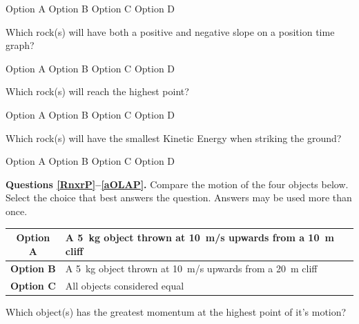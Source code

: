 \documentclass[]{exam}
\begin{document}
\begin{questions}
\begin{randomizechoices}[norandomize]
    \choice Option A
    \choice Option B
    \choice Option C
    \correctchoice Option D
\end{randomizechoices}


\question
Which rock(s) will have both a positive and negative slope on a position time graph?

\begin{randomizechoices}[norandomize]
    \correctchoice Option A
    \choice Option B
    \choice Option C
    \choice Option D
\end{randomizechoices}

\question
Which rock(s) will reach the highest point?

\begin{randomizechoices}[norandomize]
    \correctchoice Option A
    \choice Option B
    \choice Option C
    \choice Option D
\end{randomizechoices}


\question \label{louIV}
Which rock(s) will have the smallest Kinetic Energy when striking the ground?

\begin{randomizechoices}[norandomize]
    \choice Option A
    \choice Option B
    \correctchoice Option C
    \choice Option D
\end{randomizechoices}

\begin{EnvUplevel}
    \textbf{Questions \ref{RnxrP}--\ref{aOLAP}.} Compare the motion of the four objects below. Select the choice that best answers the question. Answers may be used more than once. 
\end{EnvUplevel}

\begin{center}
    \begin{tabular}{|c|l|}
        \hline 
        \textbf{Option A} & A \SI{5}{kg} object thrown at \SI{10}{m/s} upwards from a \SI{10}{m} cliff\\ \hline
        \textbf{Option B} & A \SI{5}{kg} object thrown at \SI{10}{m/s} upwards from a \SI{20}{m} cliff\\ \hline
        \textbf{Option C} & All objects considered equal\\ \hline
    \end{tabular}
\end{center}

\question \label{RnxrP}
Which object(s) has the greatest momentum at the highest point of it’s motion?


\end{questions}
\end{document}

